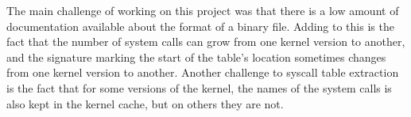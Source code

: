 The main challenge of working on this project was that there is a low amount
of documentation available about the format of a binary file. Adding to this
is the fact that the number of system calls can grow from one kernel version
to another, and the signature marking the start of the table's location
sometimes changes from one kernel version to another. Another challenge to
syscall table extraction is the fact that for some versions of the kernel, the
names of the system calls is also kept in the kernel cache, but on others they
are not.

